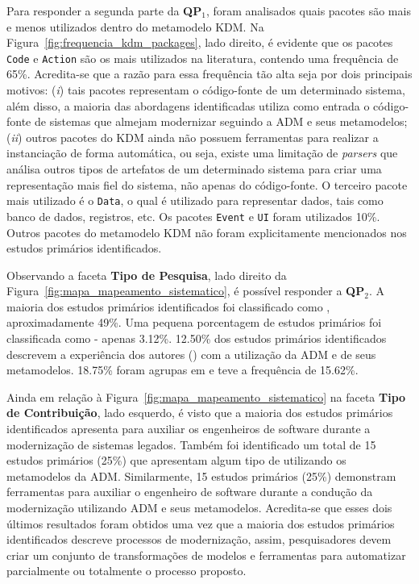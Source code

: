 Para responder a segunda parte da \textbf{QP$_1$}, foram analisados quais pacotes são mais e menos utilizados dentro do metamodelo KDM. Na Figura~\ref{fig:frequencia_kdm_packages}, lado direito, é evidente que os pacotes \texttt{Code} e \texttt{Action} são os mais utilizados na literatura, contendo uma frequência de 65\%. Acredita-se que a razão para essa frequência tão alta seja por dois principais motivos: (\textit{i}) tais pacotes representam o código-fonte de um determinado sistema, além disso, a maioria das abordagens identificadas utiliza como entrada o código-fonte de sistemas que almejam modernizar seguindo a ADM e seus metamodelos; (\textit{ii}) outros pacotes do KDM ainda não possuem ferramentas para realizar a instanciação de forma automática, ou seja, existe uma limitação de \textit{parsers} que análisa outros tipos de artefatos de um determinado sistema para criar uma representação mais fiel do sistema, não apenas do código-fonte. O terceiro pacote mais utilizado é o \texttt{Data}, o qual é utilizado para representar dados,  tais como banco de dados, registros, etc. Os pacotes \texttt{Event} e \texttt{UI} foram utilizados 10\%. Outros pacotes do metamodelo KDM não foram explicitamente mencionados nos estudos primários identificados.

Observando a faceta \textbf{Tipo de Pesquisa}, lado direito da Figura~\ref{fig:mapa_mapeamento_sistematico}, é possível responder a \textbf{QP$_2$}. A maioria dos estudos primários identificados foi classificado como , aproximadamente 49\%. Uma pequena porcentagem de estudos primários foi classificada como  - apenas 3.12\%. 12.50\% dos estudos primários identificados descrevem a experiência dos autores () com a utilização da ADM e de seus metamodelos. 18.75\% foram agrupas em  e  teve a frequência de 15.62\%.

Ainda em relação à Figura~\ref{fig:mapa_mapeamento_sistematico} na faceta \textbf{Tipo de Contribuição}, lado esquerdo, é visto que a maioria dos estudos primários identificados apresenta  para auxiliar os engenheiros de software durante a modernização de sistemas legados. Também foi identificado um total de 15 estudos primários (25\%) que apresentam algum tipo de  utilizando os metamodelos da ADM. Similarmente, 15 estudos primários (25\%) demonstram ferramentas para auxiliar o engenheiro de software durante a condução da modernização utilizando ADM e seus metamodelos. Acredita-se que esses dois últimos resultados foram obtidos uma vez que a maioria dos estudos primários identificados descreve processos de modernização, assim, pesquisadores devem criar um conjunto de transformações de modelos e ferramentas para automatizar parcialmente ou totalmente o processo proposto.

